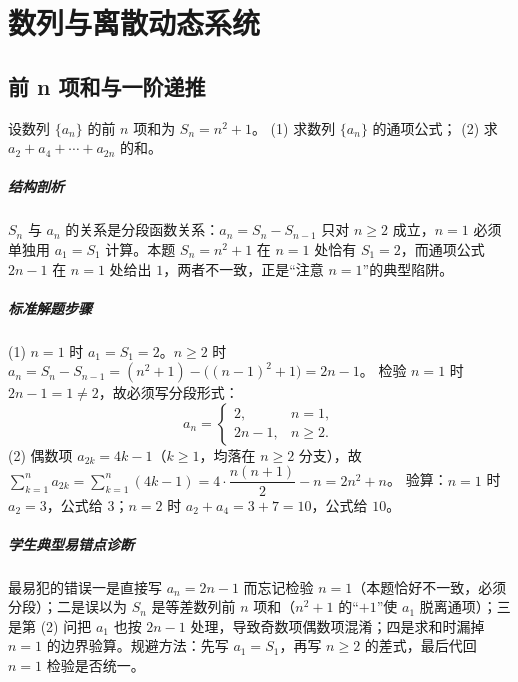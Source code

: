 \chapter{数列与离散动态系统}

\section{前 n 项和与一阶递推}

\begin{problem}
设数列 $\{a_n\}$ 的前 $n$ 项和为 $S_n=n^2+1$。
(1) 求数列 $\{a_n\}$ 的通项公式；
(2) 求 $a_2+a_4+\cdots+a_{2n}$ 的和。
\end{problem}
\begin{solution}
\paragraph{结构剖析}
$S_n$ 与 $a_n$ 的关系是分段函数关系：$a_n=S_n-S_{n-1}$ 只对 $n\ge2$ 成立，$n=1$ 必须单独用 $a_1=S_1$ 计算。本题 $S_n=n^2+1$ 在 $n=1$ 处恰有 $S_1=2$，而通项公式 $2n-1$ 在 $n=1$ 处给出 $1$，两者不一致，正是“注意 $n=1$”的典型陷阱。
\paragraph{标准解题步骤}
(1) $n=1$ 时 $a_1=S_1=2$。$n\ge2$ 时
$a_n=S_n-S_{n-1}=(n^2+1)-\bigl((n-1)^2+1\bigr)=2n-1$。
检验 $n=1$ 时 $2n-1=1\ne2$，故必须写分段形式：
$$a_n=\begin{cases}2,&n=1,\\2n-1,&n\ge2.\end{cases}$$
(2) 偶数项 $a_{2k}=4k-1$（$k\ge1$，均落在 $n\ge2$ 分支），故
$\sum_{k=1}^n a_{2k}=\sum_{k=1}^n(4k-1)=4\cdot\dfrac{n(n+1)}2-n=2n^2+n$。
验算：$n=1$ 时 $a_2=3$，公式给 $3$；$n=2$ 时 $a_2+a_4=3+7=10$，公式给 $10$。
\paragraph{学生典型易错点诊断}
最易犯的错误一是直接写 $a_n=2n-1$ 而忘记检验 $n=1$（本题恰好不一致，必须分段）；二是误以为 $S_n$ 是等差数列前 $n$ 项和（$n^2+1$ 的“$+1$”使 $a_1$ 脱离通项）；三是第 (2) 问把 $a_1$ 也按 $2n-1$ 处理，导致奇数项偶数项混淆；四是求和时漏掉 $n=1$ 的边界验算。规避方法：先写 $a_1=S_1$，再写 $n\ge2$ 的差式，最后代回 $n=1$ 检验是否统一。
\end{solution}

